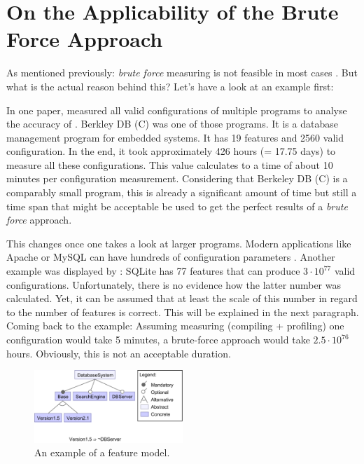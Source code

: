 \section{On the Applicability of the Brute Force Approach}
\label{sec:BruteForce}
As mentioned previously: \textit{brute force} measuring is not feasible in most cases \cite{AutomatedFeatureDetectionSiegmund2012}. But what is the actual reason behind this?
Let's have a look at an example first:

In one paper, \citet{AutomatedFeatureDetectionSiegmund2012} measured all valid configurations of multiple programs to analyse the accuracy of \AFID. Berkley DB (C) was one of those programs. It is a database management program for embedded systems. It has 19 features and 2560 valid configuration. In the end, it took approximately 426 hours (= 17.75 days) to measure all these configurations. This value calculates to a time of about 10 minutes per configuration measurement. Considering that Berkeley DB (C) is a comparably small program, this is already a significant amount of time but still a time span that might be acceptable be used to get the perfect results of a \textit{brute force} approach.

This changes once one takes a look at larger programs. Modern applications like Apache or MySQL can have hundreds of configuration parameters \cite{YouveGivenMeTooManyKnobs}. Another example was displayed by \citet{VAMOSConference}: SQLite has 77 features that can produce $3 \cdot 10^{77}$ valid configurations. Unfortunately, there is no evidence how the latter number was calculated. Yet, it can be assumed that at least the scale of this number in regard to the number of features is correct. This will be explained in the next paragraph. Coming back to the example: Assuming measuring (compiling + profiling) one configuration would take 5 minutes, a brute-force approach would take $2.5 \cdot 10^{76}$ hours. Obviously, this is not an acceptable duration.

\begin{figure}
	\includegraphics[width = 0.5\textwidth]{presentation/figures/FeatureModel}
	\captionsetup{width=0.95\linewidth}
	\caption{An example of a feature model.}
	\label{fig:FeatureModel}
\end{figure}

